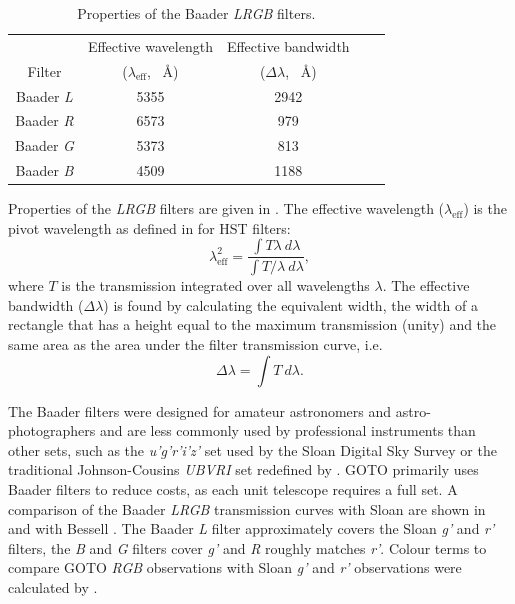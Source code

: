\begin{colsection}
\begin{table}[t]
    \begin{center}
        \begin{tabular}{c|cccc} %
             & Effective wavelength & Effective bandwidth\\
            Filter & ($\lambda_\text{eff}$, \SI{}{\angstrom}) & ($\Delta\lambda$, \SI{}{\angstrom}) \\
            \midrule
            Baader \textit{L} & 5355 & 2942 \\
            Baader \textit{R} & 6573 &  979 \\
            Baader \textit{G} & 5373 &  813 \\
            Baader \textit{B} & 4509 & 1188 \\
        \end{tabular}
    \end{center}
    \caption[Baader filter properties]{
        Properties of the Baader \textit{LRGB} filters.
    }\label{tab:filters}
\end{table}

Properties of the \textit{LRGB} filters are given in . The effective wavelength ($\lambda_\text{eff}$) is the pivot wavelength as defined in \citet{HST_calibration} for HST filters:
%
\begin{equation}
    \lambda_\text{eff}^2 = \frac{\int T\lambda~d\lambda}{\int T/\lambda~d\lambda},
    \label{eq:pivot_wavelength}
\end{equation}
%
where $T$ is the transmission integrated over all wavelengths $\lambda$. The effective bandwidth ($\Delta\lambda$) is found by calculating the equivalent width, the width of a rectangle that has a height equal to the maximum transmission (unity) and the same area as the area under the filter transmission curve, i.e. 
%
\begin{equation}
    \Delta\lambda = \int T~d\lambda.
    \label{eq:bandwidth}
\end{equation}

The Baader filters were designed for amateur astronomers and astro-photographers and are less commonly used by professional instruments than other sets, such as the \textit{u'g'r'i'z'} set used by the Sloan Digital Sky Survey  \citep{Sloan_filters} or the traditional Johnson-Cousins \textit{UBVRI} set redefined by \citet{Bessell_filters}. GOTO primarily uses Baader filters to reduce costs, as each unit telescope requires a full set. A comparison of the Baader \textit{LRGB} transmission curves with Sloan are shown in  and with Bessell . The Baader \textit{L} filter approximately covers the Sloan \textit{g'} and \textit{r'} filters, the \textit{B} and \textit{G} filters cover \textit{g'} and \textit{R} roughly matches \textit{r'}. Colour terms to compare GOTO \textit{RGB} observations with Sloan \textit{g'} and \textit{r'} observations were calculated by \citet{Phaethon}.


\end{colsection}
